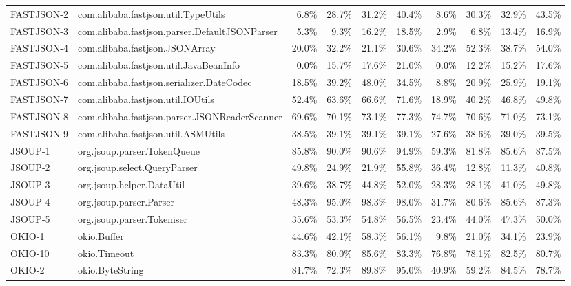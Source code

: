 \begin{tabular}{ ll rrrr rrrr}
FASTJSON-2  &  com.alibaba.fastjson.util.TypeUtils & 6.8\% & 28.7\% & 31.2\% & 40.4\% & 8.6\% & 30.3\% & 32.9\% & 43.5\%\\ 
FASTJSON-3  &  com.alibaba.fastjson.parser.DefaultJSONParser & 5.3\% & 9.3\% & 16.2\% & 18.5\% & 2.9\% & 6.8\% & 13.4\% & 16.9\%\\ 
FASTJSON-4  &  com.alibaba.fastjson.JSONArray & 20.0\% & 32.2\% & 21.1\% & 30.6\% & 34.2\% & 52.3\% & 38.7\% & 54.0\%\\ 
FASTJSON-5  &  com.alibaba.fastjson.util.JavaBeanInfo & \cellcolor{light-gray} \textcolor{black}{0.0\%} & 15.7\% & 17.6\% & 21.0\% & \cellcolor{light-gray} \textcolor{black}{0.0\%} & 12.2\% & 15.2\% & 17.6\%\\ 
FASTJSON-6  &  com.alibaba.fastjson.serializer.DateCodec & 18.5\% & 39.2\% & 48.0\% & 34.5\% & 8.8\% & 20.9\% & 25.9\% & 19.1\%\\ 
FASTJSON-7  &  com.alibaba.fastjson.util.IOUtils & 52.4\% & 63.6\% & 66.6\% & 71.6\% & 18.9\% & 40.2\% & 46.8\% & 49.8\%\\ 
FASTJSON-8  &  com.alibaba.fastjson.parser.JSONReaderScanner & 69.6\% & 70.1\% & 73.1\% & 77.3\% & 74.7\% & 70.6\% & 71.0\% & 73.1\%\\ 
FASTJSON-9  &  com.alibaba.fastjson.util.ASMUtils & 38.5\% & 39.1\% & 39.1\% & 39.1\% & 27.6\% & 38.6\% & 39.0\% & 39.5\%\\ 
JSOUP-1  &  org.jsoup.parser.TokenQueue & 85.8\% & 90.0\% & 90.6\% & 94.9\% & 59.3\% & 81.8\% & 85.6\% & 87.5\%\\ 
JSOUP-2  &  org.jsoup.select.QueryParser & 49.8\% & 24.9\% & 21.9\% & 55.8\% & 36.4\% & 12.8\% & 11.3\% & 40.8\%\\ 
JSOUP-3  &  org.jsoup.helper.DataUtil & 39.6\% & 38.7\% & 44.8\% & 52.0\% & 28.3\% & 28.1\% & 41.0\% & 49.8\%\\ 
JSOUP-4  &  org.jsoup.parser.Parser & 48.3\% & 95.0\% & 98.3\% & 98.0\% & 31.7\% & 80.6\% & 85.6\% & 87.3\%\\ 
JSOUP-5  &  org.jsoup.parser.Tokeniser & 35.6\% & 53.3\% & 54.8\% & 56.5\% & 23.4\% & 44.0\% & 47.3\% & 50.0\%\\ 
OKIO-1  &  okio.Buffer & 44.6\% & 42.1\% & 58.3\% & 56.1\% & 9.8\% & 21.0\% & 34.1\% & 23.9\%\\ 
OKIO-10  &  okio.Timeout & 83.3\% & 80.0\% & 85.6\% & 83.3\% & 76.8\% & 78.1\% & 82.5\% & 80.7\%\\ 
OKIO-2  &  okio.ByteString & 81.7\% & 72.3\% & 89.8\% & 95.0\% & 40.9\% & 59.2\% & 84.5\% & 78.7\%\\ 

\end{tabular}

